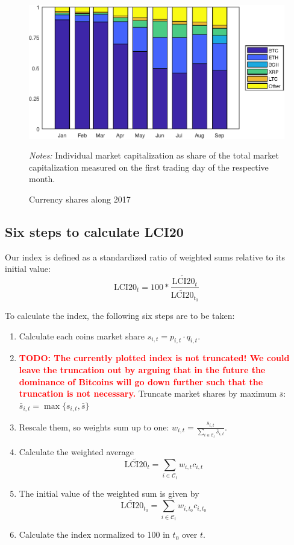 \documentclass[11pt]{article}
\newcommand\fnotes[1]{\captionsetup{font=scriptsize}\caption*{\textsl{Notes:} #1}}
\newcommand{\todo}[1]{\textbf{\textcolor{red}{TODO: #1}}}
\begin{document}
\begin{figure}[p]%
    \centering%
    \caption{Currency shares along 2017}\label{f:curshares}%
    \includegraphics[width=\textwidth]{figs/currency_shares.eps}%
    \medskip\newline%
    \fnotes{Individual market capitalization as share of the total market capitalization measured on the first trading day of the respective month.}
\end{figure}


\subsection{Six steps to calculate LCI20}

Our index is defined as a standardized ratio of weighted sums relative to its initial value:
\begin{equation}
  \text{LCI20}_t = 100 * \frac{\widetilde{\text{LCI20}}_t}{\widetilde{\text{LCI20}}_{t_0}}
\end{equation}

\noindent To calculate the index, the following six steps are to be taken:
\begin{enumerate}
  \item Calculate each coins market share $s_{i,t} = p_{i,t} \cdot q_{i,t}$.
  \item \todo{The currently plotted index is not truncated! We could leave the truncation out by arguing that in the future the dominance of Bitcoins will go down further such that the truncation is not necessary.} Truncate market shares by maximum $\bar s$: $\bar s_{i,t} = \max\{ s_{i,t}, \bar s\}$
  \item Rescale them, so weights sum up to one: $w_{i,t} = \frac{\bar s_{i,t}}{\sum_{i \in \mathcal{C}_t} \bar s_{i,t}}$. %
  \item Calculate the weighted average $$\widetilde{\text{LCI20}}_t = \sum_{i \in \mathcal{C}_{t}} w_{i,t} c_{i,t}$$
  \item The initial value of the weighted sum is given by $$\widetilde{\text{LCI20}}_{t_0} = \sum_{i \in \mathcal{C}_{t}} w_{i,t_0} c_{i,t_0}$$
  \item Calculate the index normalized to 100 in $t_0$ over $t$. %
\end{enumerate}
\end{document}
